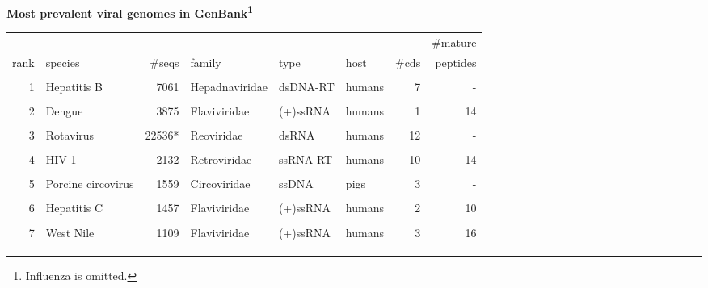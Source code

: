 \documentclass[landscape]{slides}
\begin{document}
\begin{slide}
\begin{center}

\textbf{Most prevalent viral genomes in GenBank\footnote{Influenza is omitted.}}

\tiny
\begin{tabular}{r|l|r|l|l|l|r|r}
       &                    &              &                &          &        &       & \#mature \\ 
  rank & species            &       \#seqs & family         & type     & host   & \#cds & peptides \\ \hline
       &                    &              &                &          &        &       &          \\ 
     1 & Hepatitis B        &         7061 & Hepadnaviridae & dsDNA-RT & humans &     7 &       -  \\
       &                    &              &                &          &        &       &          \\ 
     2 & Dengue             &         3875 & Flaviviridae   & (+)ssRNA & humans &     1 &      14  \\
       &                    &              &                &          &        &       &          \\ 
     3 & Rotavirus          &      22536*  & Reoviridae     & dsRNA    & humans &    12 &       -  \\
       &                    &              &                &          &        &       &          \\ 
     4 & HIV-1              &        2132  & Retroviridae   & ssRNA-RT & humans &    10 &      14  \\
       &                    &              &                &          &        &       &          \\ 
     5 & Porcine circovirus &        1559  & Circoviridae   & ssDNA    & pigs   &     3 &       -  \\
       &                    &              &                &          &        &       &          \\ 
     6 & Hepatitis C        &        1457  & Flaviviridae   & (+)ssRNA & humans &     2 &      10  \\
       &                    &              &                &          &        &       &          \\ 
     7 & West Nile          &        1109  & Flaviviridae   & (+)ssRNA & humans &     3 &      16  \\

\end{tabular}
\end{center}
\end{slide}
\end{document}
